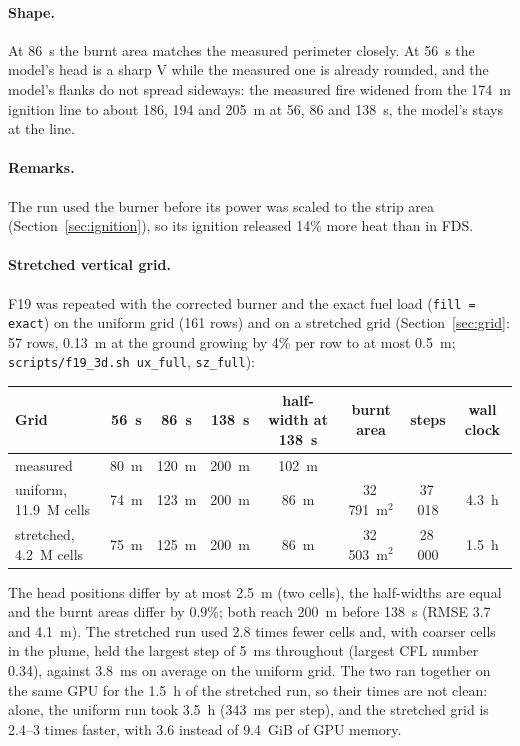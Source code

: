 \documentclass[11pt,a4paper]{article}
\newcommand{\code}[1]{\texttt{#1}}
\begin{document}
\paragraph{Shape.} At 86~s the burnt area matches the measured perimeter closely. At 56~s the model's head is
a sharp V while the measured one is already rounded, and the model's flanks do not spread sideways: the
measured fire widened from the 174~m ignition line to about 186, 194 and 205~m at 56, 86 and 138~s, the model's
stays at the line.

\paragraph{Remarks.} The run used the burner before its power was scaled to the strip area
(Section~\ref{sec:ignition}), so its ignition released 14\% more heat than in FDS.

\paragraph{Stretched vertical grid.} F19 was repeated with the corrected burner and the exact fuel load
(\code{fill = exact}) on the uniform grid (161 rows) and on a stretched grid (Section~\ref{sec:grid}: 57 rows,
0.13~m at the ground growing by 4\% per row to at most 0.5~m; \code{scripts/f19\_3d.sh ux\_full},
\code{sz\_full}):
\begin{center}
\small\setlength{\tabcolsep}{4.5pt}
\begin{tabular}{lccccccc}
\toprule
Grid & 56~s & 86~s & 138~s & half-width at 138~s & burnt area & steps & wall clock \\
\midrule
measured & 80~m & 120~m & 200~m & 102~m & & & \\
uniform, 11.9~M cells & 74~m & 123~m & 200~m & 86~m & 32\,791~m$^2$ & 37\,018 & 4.3~h \\
stretched, 4.2~M cells & 75~m & 125~m & 200~m & 86~m & 32\,503~m$^2$ & 28\,000 & 1.5~h \\
\bottomrule
\end{tabular}
\end{center}
The head positions differ by at most 2.5~m (two cells), the half-widths are equal and the burnt areas differ
by 0.9\%; both reach 200~m before 138~s (RMSE 3.7 and 4.1~m). The stretched run used 2.8 times fewer cells
and, with coarser cells in the plume, held the largest step of 5~ms throughout (largest CFL number 0.34),
against 3.8~ms on average on the uniform grid. The two ran together on the same GPU for the 1.5~h of the
stretched run, so their times are not clean: alone, the uniform run took 3.5~h (343~ms per step), and the
stretched grid is 2.4--3 times faster, with 3.6 instead of 9.4~GiB of GPU memory.
\end{document}
